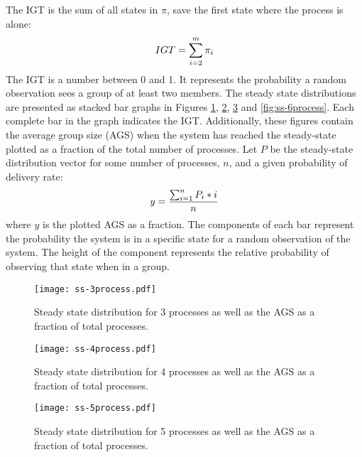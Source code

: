 The \ac{IGT} is the sum of all states in $\pi$, save the first state where the process is alone:
\vspace{24pt}
\begin{equation} IGT = \sum_{i=2}^{m} \pi_i
    \vspace{24pt}
\end{equation}
The \ac{IGT} is a number between 0 and 1.
It represents the probability a random observation sees a group of at least two members.
The steady state distributions are presented as stacked bar graphs in Figures \ref{fig:ss-3process}, \ref{fig:ss-4process}, \ref{fig:ss-5process} and \ref{fig:ss-6process}.
Each complete bar in the graph indicates the \ac{IGT}.
Additionally, these figures contain the average group size (AGS) when the system has reached the steady-state plotted as a fraction of the total number of processes.
Let $P$ be the steady-state distribution vector for some number of processes, $n$, and a given probability of delivery rate:
\vspace{12pt}
\begin{equation} y = \frac{\sum_{i=1}^{n} P_{i}*i}{n} \label{eq:ss-means}
    \vspace{12pt}
\end{equation}
where $y$ is the plotted \ac{AGS} as a fraction.
The components of each bar represent the probability the system is in a specific state for a random observation of the system.
The height of the component represents the relative probability of observing that state when in a group.

\begin{figure}[htbp]
    \centering
    \texttt{[image: ss-3process.pdf]}
    \caption{Steady state distribution for 3 processes as well as the \ac{AGS} as a fraction of total processes.}
    \label{fig:ss-3process}
\end{figure}

\begin{figure}[htbp]
    \centering
    \texttt{[image: ss-4process.pdf]}
    \caption{Steady state distribution for 4 processes as well as the \ac{AGS} as a fraction of total processes.}
    \label{fig:ss-4process}
\end{figure}

\begin{figure}[htbp]
    \centering
    \texttt{[image: ss-5process.pdf]}
    \caption{Steady state distribution for 5 processes as well as the \ac{AGS} as a fraction of total processes.}
    \label{fig:ss-5process}
\end{figure}

